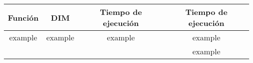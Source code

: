 \begin{tabular}{||c|c|c|c||}
    \hline
    \textbf{Función} & \textbf{DIM} & \textbf{Tiempo de ejecución} & \textbf{Tiempo de ejecución}\\ \hline
    example          & example      & example & example       \\ \hline
                    &              &           & example    \\ \hline
\end{tabular}
